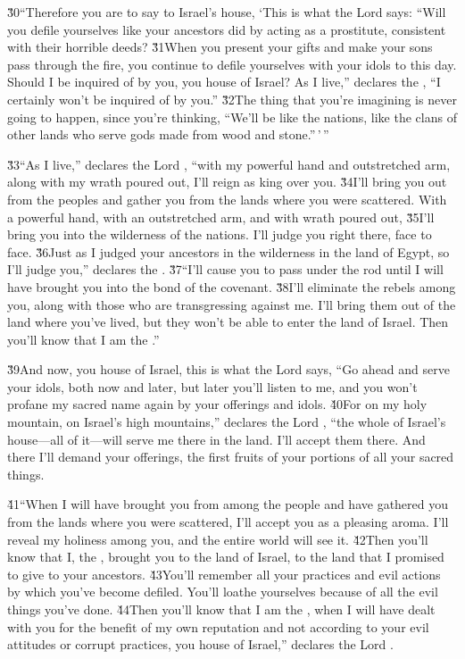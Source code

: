 \v{30}``Therefore you are to say to Israel's house, `This is what the Lord  says: ``Will you defile yourselves like your ancestors did by acting as a prostitute, consistent with their horrible deeds? \v{31}When you present your gifts and make your sons pass through the fire, you continue to defile yourselves with your idols to this day. Should I be inquired of by you, you house of Israel? As I live,'' declares the , ``I certainly won't be inquired of by you.'' \v{32}The thing that you're imagining is never going to happen, since you're thinking, ``We'll be like the nations, like the clans of other lands who serve gods made from wood and stone.''\,'\,''

\v{33}``As I live,'' declares the Lord , ``with my powerful hand and outstretched arm, along with my wrath poured out, I'll reign as king over you. \v{34}I'll bring you out from the peoples and gather you from the lands where you were scattered. With a powerful hand, with an outstretched arm, and with wrath poured out, \v{35}I'll bring you into the wilderness of the nations. I'll judge you right there, face to face. \v{36}Just as I judged your ancestors in the wilderness in the land of Egypt, so I'll judge you,'' declares the . \v{37}``I'll cause you to pass under the rod until I will have brought you into the bond of the covenant. \v{38}I'll eliminate the rebels among you, along with those who are transgressing against me. I'll bring them out of the land where you've lived, but they won't be able to enter the land of Israel. Then you'll know that I am the .''

\v{39}And now, you house of Israel, this is what the Lord  says, ``Go ahead and serve your idols, both now and later, but later you'll listen to me, and you won't profane my sacred name again by your offerings and idols. \v{40}For on my holy mountain, on Israel's high mountains,'' declares the Lord , ``the whole of Israel's house---all of it---will serve me there in the land. I'll accept them there. And there I'll demand your offerings, the first fruits of your portions of all your sacred things.

\v{41}``When I will have brought you from among the people and have gathered you from the lands where you were scattered, I'll accept you as a pleasing aroma. I'll reveal my holiness among you, and the entire world will see it. \v{42}Then you'll know that I, the , brought you to the land of Israel, to the land that I promised to give to your ancestors. \v{43}You'll remember all your practices and evil actions by which you've become defiled. You'll loathe yourselves because of all the evil things you've done. \v{44}Then you'll know that I am the , when I will have dealt with you for the benefit of my own reputation and not according to your evil attitudes or corrupt practices, you house of Israel,'' declares the Lord .

